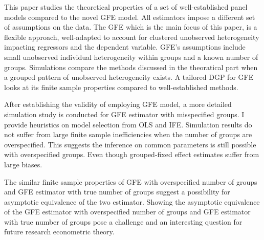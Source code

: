 This paper studies the theoretical properties of a set of well-established panel models compared to the novel GFE model.  All estimators impose a different set of assumptions on the data. The GFE which is the main focus of this paper, is a flexible approach, well-adapted to account for clustered unobserved heterogeneity impacting regressors and the dependent variable. GFE's assumptions include small unobserved individual heterogeneity within groups and a known number of groups. 
Simulations compare the methods discussed in the theoratical part when a grouped pattern of unobserved heterogeneity exists. A tailored DGP for GFE looks at its finite sample properties compared to well-established methods. 

After establishing the validity of employing GFE model, a more detailed simulation study is conducted for GFE estimator with misspecified groups. I provide heuristics on model selection from OLS and IFE. 
Simulation results do not suffer from large finite sample inefficiencies when the number of groups are overspecified. This suggests the inference on common parameters is still possible with overspecified groups. Even though grouped-fixed effect estimates suffer from large biases.

The similar finite sample properties of GFE with overspecified number of groups and GFE estimator with true number of groups suggest a possibility for asymptotic equivalence of the two estimator. Showing the asymptotic equivalence of the GFE estimator with overspecified number of groups and GFE estimator with true number of groups pose  a challenge and an interesting question for future research econometric theory.
